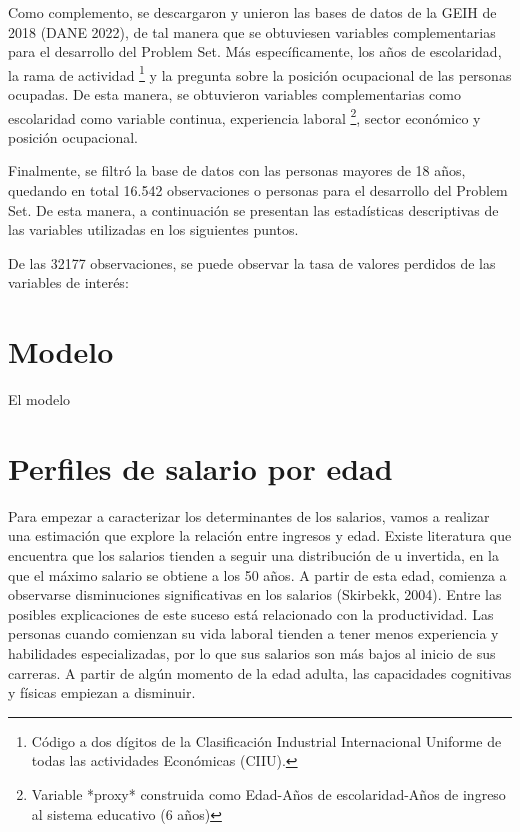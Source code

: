 \documentclass[
  11pt,
  letterpaper,
]{article}
\begin{document}
Como complemento, se descargaron y unieron las bases de datos de la GEIH
de 2018 (DANE 2022), de tal manera que se obtuviesen variables
complementarias para el desarrollo del Problem Set. Más específicamente,
los años de escolaridad, la rama de actividad
\footnote{Código a dos dígitos de la Clasificación Industrial Internacional Uniforme de todas las actividades Económicas (CIIU).}
y la pregunta sobre la posición ocupacional de las personas ocupadas. De
esta manera, se obtuvieron variables complementarias como escolaridad
como variable continua, experiencia laboral
\footnote{ Variable *proxy* construida como  Edad-Años de escolaridad-Años de ingreso al sistema educativo (6 años)},
sector económico y posición ocupacional.

Finalmente, se filtró la base de datos con las personas mayores de 18
años, quedando en total 16.542 observaciones o personas para el
desarrollo del Problem Set. De esta manera, a continuación se presentan
las estadísticas descriptivas de las variables utilizadas en los
siguientes puntos.

De las 32177 observaciones, se puede observar la tasa de valores
perdidos de las variables de interés:

\hypertarget{modelo}{%
\section{Modelo}\label{modelo}}

El modelo

\hypertarget{perfiles-de-salario-por-edad}{%
\section{Perfiles de salario por
edad}\label{perfiles-de-salario-por-edad}}

Para empezar a caracterizar los determinantes de los salarios, vamos a
realizar una estimación que explore la relación entre ingresos y edad.
Existe literatura que encuentra que los salarios tienden a seguir una
distribución de u invertida, en la que el máximo salario se obtiene a
los 50 años. A partir de esta edad, comienza a observarse disminuciones
significativas en los salarios (Skirbekk, 2004). Entre las posibles
explicaciones de este suceso está relacionado con la productividad. Las
personas cuando comienzan su vida laboral tienden a tener menos
experiencia y habilidades especializadas, por lo que sus salarios son
más bajos al inicio de sus carreras. A partir de algún momento de la
edad adulta, las capacidades cognitivas y físicas empiezan a disminuir.
\end{document}
